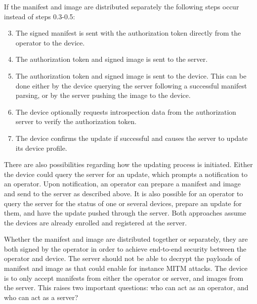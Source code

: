 \documentclass[0-thesis.tex]{subfiles}
\begin{document}
If the manifest and image are distributed separately the following steps occur instead of
steps 0.3-0.5:

\begin{enumerate}[label=1.\arabic*]
    \setcounter{enumi}{2}
    \item The signed manifest is sent with the authorization token directly from the
            operator to the device.
    \item The authorization token and signed image is sent to the server.
    \item The authorization token and signed image is sent to the device. This can be done
            either by the device querying the server following a successful manifest parsing,
            or by the server pushing the image to the device.
    \item The device optionally requests introspection data from the authorization server
            to verify the authorization token.
    \item The device confirms the update if successful and causes the server to update
            its device profile.
\end{enumerate}

There are also possibilities regarding how the updating process is initiated. Either the
device could query the server for an update, which prompts a notification to an operator.
Upon notification, an operator can prepare a manifest and image and send to the server as
described above. It is also possible for an operator to query the server for the status of
one or several devices, prepare an update for them, and have the update pushed through the
server. Both approaches assume the devices are already enrolled and registered at the
server.

Whether the manifest and image are distributed together or separately, they are both
signed by the operator in order to achieve end-to-end security between the operator and
device. The server should not be able to decrypt the payloads of manifest and image as
that could enable for instance MITM attacks. The device is to only accept manifests from
either the operator or server, and images from the server. This raises two important
questions: who can act as an operator, and who can act as a server?
\end{document}
